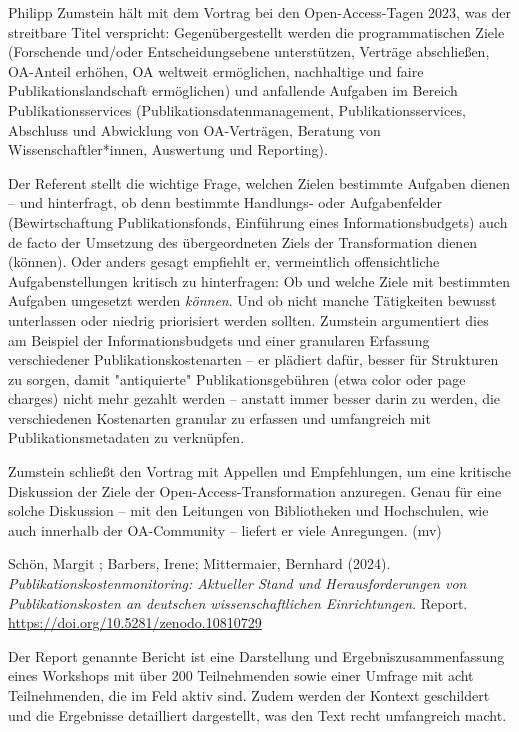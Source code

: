 \documentclass[a4paper,
fontsize=11pt,
oneside,
numbers=noperiodatend,
parskip=half-,
bibliography=totoc,
final
]{scrartcl}
\begin{document}
Philipp Zumstein hält mit dem Vortrag bei den Open-Access-Tagen 2023,
was der streitbare Titel verspricht: Gegenübergestellt werden die
programmatischen Ziele (Forschende und/oder Entscheidungsebene
unterstützen, Verträge abschließen, OA-Anteil erhöhen, OA weltweit
ermöglichen, nachhaltige und faire Publikationslandschaft ermöglichen)
und anfallende Aufgaben im Bereich Publikationsservices
(Publikationsdatenmanagement, Publikationsservices, Abschluss und
Abwicklung von OA-Verträgen, Beratung von Wissenschaftler*innen,
Auswertung und Reporting).

Der Referent stellt die wichtige Frage, welchen Zielen bestimmte
Aufgaben dienen -- und hinterfragt, ob denn bestimmte Handlungs- oder
Aufgabenfelder (Bewirtschaftung Publikationsfonds, Einführung eines
Informationsbudgets) auch de facto der Umsetzung des übergeordneten
Ziels der Transformation dienen (können). Oder anders gesagt empfiehlt
er, vermeintlich offensichtliche Aufgabenstellungen kritisch zu
hinterfragen: Ob und welche Ziele mit bestimmten Aufgaben umgesetzt
werden \emph{können}. Und ob nicht manche Tätigkeiten bewusst
unterlassen oder niedrig priorisiert werden sollten. Zumstein
argumentiert dies am Beispiel der Informationsbudgets und einer
granularen Erfassung verschiedener Publikationskostenarten -- er
plädiert dafür, besser für Strukturen zu sorgen, damit "antiquierte"
Publikationsgebühren (etwa color oder page charges) nicht mehr gezahlt
werden -- anstatt immer besser darin zu werden, die verschiedenen
Kostenarten granular zu erfassen und umfangreich mit
Publikationsmetadaten zu verknüpfen.

Zumstein schließt den Vortrag mit Appellen und Empfehlungen, um eine
kritische Diskussion der Ziele der Open-Access-Transformation anzuregen.
Genau für eine solche Diskussion -- mit den Leitungen von Bibliotheken
und Hochschulen, wie auch innerhalb der OA-Community -- liefert er viele
Anregungen. (mv)

Schön, Margit ; Barbers, Irene; Mittermaier, Bernhard (2024).
\emph{Publikationskostenmonitoring: Aktueller Stand und
Herausforderungen von Publikationskosten an deutschen wissenschaftlichen
Einrichtungen}. Report. \url{https://doi.org/10.5281/zenodo.10810729}

Der Report genannte Bericht ist eine Darstellung und
Ergebniszusammenfassung eines Workshops mit über 200 Teilnehmenden sowie
einer Umfrage mit acht Teilnehmenden, die im Feld aktiv sind. Zudem
werden der Kontext geschildert und die Ergebnisse detailliert
dargestellt, was den Text recht umfangreich macht.
\end{document}
